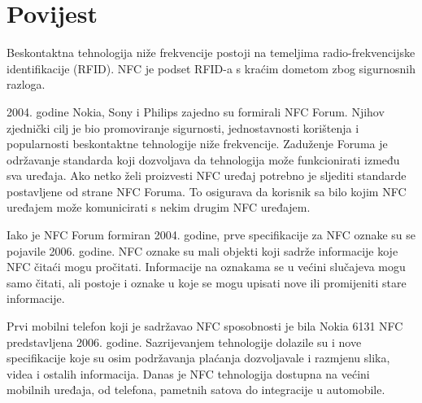 \documentclass[times, utf8, zavrsni]{fer}
\begin{document}
\section{Povijest}
Beskontaktna tehnologija niže frekvencije postoji na temeljima radio-frekvencijske identifikacije (RFID). NFC je podset RFID-a s kraćim dometom zbog sigurnosnih razloga.\par 
2004. godine Nokia, Sony i Philips zajedno su formirali NFC Forum. Njihov zjednički cilj je bio promoviranje sigurnosti, jednostavnosti korištenja i popularnosti beskontaktne tehnologije niže frekvencije. Zaduženje Foruma je održavanje standarda koji dozvoljava da tehnologija može funkcionirati između sva uređaja. Ako netko želi proizvesti NFC uređaj potrebno je sljediti standarde postavljene od strane NFC Foruma. To osigurava da korisnik sa bilo kojim NFC uređajem može komunicirati s nekim drugim NFC uređajem.\par
Iako je NFC Forum formiran 2004. godine, prve specifikacije za NFC oznake su se pojavile 2006. godine. NFC oznake su mali objekti koji sadrže informacije koje NFC čitaći mogu pročitati. Informacije na oznakama se u većini slučajeva mogu samo čitati, ali postoje i oznake u koje se mogu upisati nove ili promijeniti stare informacije.\par 
Prvi mobilni telefon koji je sadržavao NFC sposobnosti je bila Nokia 6131 NFC predstavljena 2006. godine. Sazrijevanjem tehnologije dolazile su i nove specifikacije koje su osim podržavanja plaćanja dozvoljavale i razmjenu slika, videa i ostalih informacija. Danas je NFC tehnologija dostupna na većini mobilnih uređaja, od telefona, pametnih satova do integracije u automobile.
\end{document}
